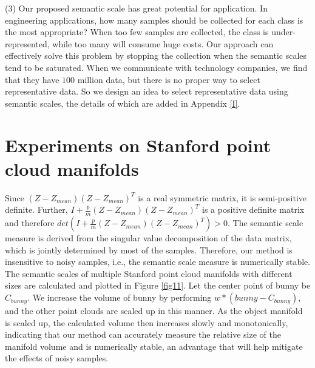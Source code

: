 \documentclass[10pt]{article} %
\begin{document}
(3) Our proposed semantic scale has great potential for application. In engineering applications, how many samples should be collected for each class is the most appropriate? When too few samples are collected, the class is under-represented, while too many will consume huge costs. Our approach can effectively solve this problem by stopping the collection when the semantic scales tend to be saturated. When we communicate with technology companies, we find that they have $100$ million data, but there is no proper way to select representative data. So we design an idea to select representative data using semantic scales, the details of which are added in Appendix \ref{I}.


\section{Experiments on Stanford point cloud manifolds\label{Experiments on Stanford point cloud manifolds}}

Since $(Z-Z_{mean})(Z-Z_{mean})^T$ is a real symmetric matrix, it is semi-positive definite. Further, $I+\frac{p}{m} (Z-Z_{mean})(Z-Z_{mean})^T$ is a positive definite matrix and therefore $det(I+\frac{p}{m} (Z-Z_{mean})(Z-Z_{mean})^T)>0$. The semantic scale measure is derived from the singular value decomposition of the data matrix, which is jointly determined by most of the samples. Therefore, our method is insensitive to noisy samples, i.e., the semantic scale measure is numerically stable. The semantic scales of multiple Stanford point cloud manifolds with different sizes are calculated and plotted in Figure \ref{fig11}. Let the center point of bunny be $C_{bunny}$. We increase the volume of bunny by performing $w*(bunny-C_{bunny})$, and the other point clouds are scaled up in this manner. As the object manifold is scaled up, the calculated volume then increases slowly and monotonically, indicating that our method can accurately measure the relative size of the manifold volume and is numerically stable, an advantage that will help mitigate the effects of noisy samples.
\end{document}
